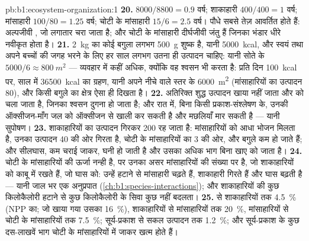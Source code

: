 \begin{solution}{pb:b1:ecosystem-organization:1}
\textbf{20.}  $8000/8800 = 0.9$ वर्ष; शाकाहारी $400/400 =
1$ वर्ष; मांसाहारी $100/80 = 1.25$ वर्ष; चोटी के मांसाहारी $15/6 =
2.5$ वर्ष। पौधे सबसे तेज़ आवर्तित होते हैं: अल्पजीवी , जो लगातार
चरा जाता है; और चोटी के मांसाहारी दीर्घजीवी जंतु हैं जिनका भंडार
धीरे नवीकृत होता है।
\textbf{21.} \qty{2}{kg} का कोई बगुला लगभग \qty{500}{g} शुष्क है,
यानी \qty{5000}{kcal}, और स्वयं तथा अपने बच्चों की जगह भरने के लिए हर
साल लगभग उतना ही उत्पादन चाहिए: यानी सोते के $5000/6 \approx \qty{800}{m^2}$
--- व्यवहार में कहीं अधिक, क्योंकि वह श्वसन भी करता है: प्रति दिन
\qty{100}{kcal} पर, साल में \qty{36500}{kcal} का ग्रहण, यानी अपने नीचे
वाले स्तर के \qty{6000}{m^2} (मांसाहारियों का उत्पादन
\qty{80}{}), और किसी बगुले का क्षेत्र ऐसा ही दिखता है।
\textbf{22.} अतिरिक्त शुद्ध उत्पादन खाया नहीं जाता और  को
चला जाता है, जिनका श्वसन दुगना हो जाता है; और रात में, बिना किसी
प्रकाश-संश्लेषण के, उनकी ऑक्सीजन-माँग जल को ऑक्सीजन से खाली कर सकती है
और मछलियाँ मार सकती है --- यानी सुपोषण।
\textbf{23.} शाकाहारियों का उत्पादन गिरकर \qty{200}{} रह जाता है:
मांसाहारियों को आधा भोजन मिलता है, उनका उत्पादन \qty{40}{} की ओर गिरता
है, चोटी के मांसाहारियों का 3 की ओर, और बगुले कम हो जाते हैं; और सीलघास,
कम चराई जाकर, घनी हो जाती है और उसका अधिक भाग बिना खाए  को जाता है।
\textbf{24.} चोटी के मांसाहारियों की ऊर्जा नन्ही है, पर उनका असर
मांसाहारियों की संख्या पर है, जो शाकाहारियों को काबू में रखते हैं, जो
घास को: उन्हें हटाने से मांसाहारी चढ़ते हैं, शाकाहारी गिरते हैं और घास
बढ़ती है --- यानी जाल भर एक अनुप्रपात
(\cref{ch:b1:species-interactions}); और शाकाहारियों की कुछ किलोकैलोरी
हटाने से कुछ किलोकैलोरी के सिवा कुछ नहीं बदलता।
\textbf{25.}  से शाकाहारियों तक \qty{4.5}{\%} (NPP का; जो खाया
गया उसका \qty{16}{\%}), शाकाहारियों से मांसाहारियों तक \qty{20}{\%},
मांसाहारियों से चोटी के मांसाहारियों तक \qty{7.5}{\%}; सूर्य-प्रकाश से
सकल उत्पादन तक \qty{1.2}{\%}; और सूर्य-प्रकाश के कुछ दस-लाखवें भाग चोटी
के मांसाहारियों में जाकर खत्म होते हैं।
\end{solution}
